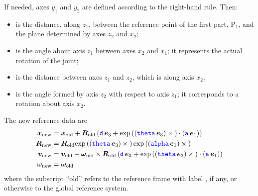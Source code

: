 If needed, axes $y_1$ and $y_2$ are defined according to the right-hand rule.
Then:
\begin{itemize}
\item {} is the distance, along $z_1$, between the reference point of the first part, $\text{P}_1$, and the plane determined by axes $z_2$ and $x_2$;

\item {} is the angle about axis $z_1$ between axes $x_2$ and $x_1$; it represents the actual rotation of the joint;

\item {} is the distance between axes $z_1$ and $z_2$, which is along axis $x_2$;

\item {} is the angle formed by axis $z_2$ with respect to axis $z_1$; it corresponds to a rotation about axis $x_2$.
\end{itemize}

The new reference data are
\begin{subequations}
\begin{align}
	\boldsymbol{x}_\text{new}
	&=
	\boldsymbol{x}_\text{old}
	+
	\boldsymbol{R}_\text{old} \left( 
		\textcolor{blue}{\texttt{d}} \, \boldsymbol{e}_3
		+
		\text{exp}\left( \left( \textcolor{blue}{\texttt{theta}} \, \boldsymbol{e}_3 \right) \times{} \right) \cdot \left( \textcolor{blue}{\texttt{a}} \, \boldsymbol{e}_1 \right)
	 \right)
	\\
	\boldsymbol{R}_\text{new}
	&=
	\boldsymbol{R}_\text{old} \text{exp}\left( \left( \textcolor{blue}{\texttt{theta}} \, \boldsymbol{e}_3 \right) \times{} \right) \text{exp}\left( \left( \textcolor{blue}{\texttt{alpha}} \, \boldsymbol{e}_1 \right) \times{} \right)
	\\
	\boldsymbol{v}_\text{new}
	&=
	\boldsymbol{v}_\text{old}
	+
	\boldsymbol{\omega}_\text{old} \times \boldsymbol{R}_\text{old} \left( 
		\textcolor{blue}{\texttt{d}} \, \boldsymbol{e}_3
		+
		\text{exp}\left( \left( \textcolor{blue}{\texttt{theta}} \, \boldsymbol{e}_3 \right) \times{} \right) \cdot \left( \textcolor{blue}{\texttt{a}} \, \boldsymbol{e}_1 \right)
	 \right)
	\\
	\boldsymbol{\omega}_\text{new}
	&=
	\boldsymbol{\omega}_\text{old}
\end{align}
\end{subequations}
where the subscript ``old'' refers to the reference frame with label , if any, or otherwise to the global reference system.

